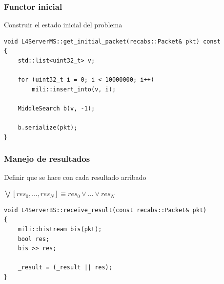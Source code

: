 \begin{frame}[fragile]\frametitle{Functor inicial}
    \begin{block}{}\centering Construir el estado inicial del problema\end{block}
    \begin{center}
    \end{center}
    \pause
    \lstset{language=C++}
    \begin{lstlisting}[frame=single]
void L4ServerMS::get_initial_packet(recabs::Packet& pkt) const
{
    std::list<uint32_t> v;

    for (uint32_t i = 0; i < 10000000; i++)
        mili::insert_into(v, i);

    MiddleSearch b(v, -1);

    b.serialize(pkt);
}
    \end{lstlisting}
\end{frame}

\begin{frame}[fragile]\frametitle{Manejo de resultados}
    \begin{block}{}\centering Definir que se hace con cada resultado arribado\end{block}
    \pause
    \begin{center}
        $\bigvee [res_0, ..., res_N] \equiv res_0 \vee ... \vee res_N$
    \end{center}
    \lstset{language=C++}
    \begin{lstlisting}[frame=single]
void L4ServerBS::receive_result(const recabs::Packet& pkt)
{
    mili::bistream bis(pkt);
    bool res;
    bis >> res;

    _result = (_result || res);
}
    \end{lstlisting}
\end{frame}

